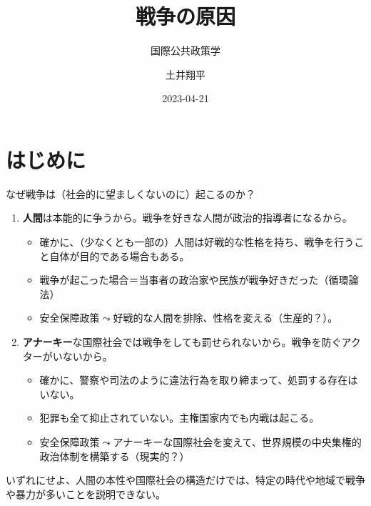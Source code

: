 \documentclass[
  xelatex,
  ja=standard]{bxjsarticle}
\title{戦争の原因}
\subtitle{国際公共政策学}
\author{土井翔平}
\date{2023-04-21}
\providecommand{\tightlist}{%
  \setlength{\itemsep}{0pt}\setlength{\parskip}{0pt}}\usepackage{longtable,booktabs,array}
\begin{document}
\maketitle
\ifdefined\Shaded\renewenvironment{Shaded}{\begin{tcolorbox}[sharp corners, enhanced, interior hidden, borderline west={3pt}{0pt}{shadecolor}, frame hidden, breakable, boxrule=0pt]}{\end{tcolorbox}}\fi

\hypertarget{ux306fux3058ux3081ux306b}{%
\section*{はじめに}\label{ux306fux3058ux3081ux306b}}

なぜ戦争は（社会的に望ましくないのに）起こるのか？

\begin{enumerate}
\def\labelenumi{\arabic{enumi}.}
\tightlist
\item
  \textbf{⼈間}は本能的に争うから。戦争を好きな⼈間が政治的指導者になるから。

  \begin{itemize}
  \tightlist
  \item
    確かに、（少なくとも一部の）人間は好戦的な性格を持ち、戦争を行うこと自体が目的である場合もある。
  \item
    戦争が起こった場合＝当事者の政治家や⺠族が戦争好きだった（循環論法）
  \item
    安全保障政策\(\leadsto\)好戦的な人間を排除、性格を変える（生産的？）。
  \end{itemize}
\item
  \textbf{アナーキー}な国際社会では戦争をしても罰せられないから。戦争を防ぐアクターがいないから。

  \begin{itemize}
  \tightlist
  \item
    確かに、警察や司法のように違法行為を取り締まって、処罰する存在はいない。
  \item
    犯罪も全て抑止されていない。主権国家内でも内戦は起こる。
  \item
    安全保障政策\(\leadsto\)アナーキーな国際社会を変えて、世界規模の中央集権的政治体制を構築する（現実的？）
  \end{itemize}
\end{enumerate}

いずれにせよ、人間の本性や国際社会の構造だけでは、特定の時代や地域で戦争や暴力が多いことを説明できない。
\end{document}
